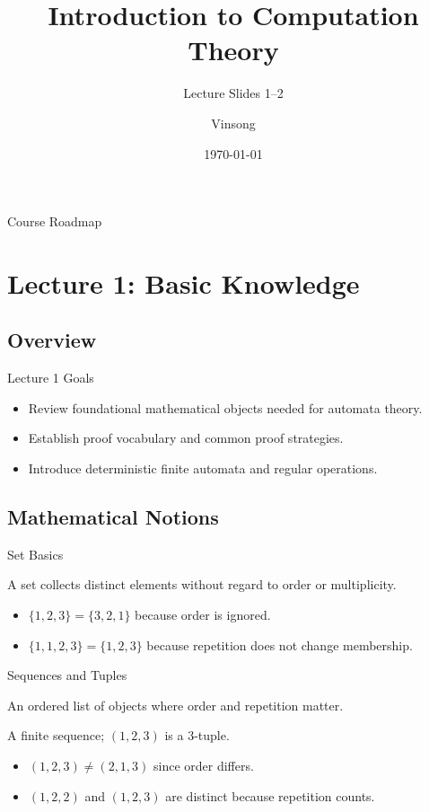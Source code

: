\documentclass[aspectratio=169]{beamer}
\title{Introduction to Computation Theory}
\subtitle{Lecture Slides 1--2}
\author{Vinsong}
\institute{NTU AMFL}
\date{\today}
\begin{document}
\begin{frame}
  \titlepage
\end{frame}

\begin{frame}{Course Roadmap}
  \tableofcontents
\end{frame}

\section{Lecture 1: Basic Knowledge}

\subsection{Overview}

\begin{frame}{Lecture 1 Goals}
  \begin{itemize}
    \item Review foundational mathematical objects needed for automata theory.
    \item Establish proof vocabulary and common proof strategies.
    \item Introduce deterministic finite automata and regular operations.
  \end{itemize}
\end{frame}

\subsection{Mathematical Notions}

\begin{frame}{Set Basics}
  \begin{definition}[Set]
    A set collects distinct elements without regard to order or multiplicity.
  \end{definition}
  \begin{itemize}
    \item $\{1,2,3\} = \{3,2,1\}$ because order is ignored.
    \item $\{1,1,2,3\} = \{1,2,3\}$ because repetition does not change membership.
  \end{itemize}
\end{frame}

\begin{frame}{Sequences and Tuples}
  \begin{definition}[Sequence]
    An ordered list of objects where order and repetition matter.
  \end{definition}
  \begin{definition}[Tuple]
    A finite sequence; $(1,2,3)$ is a $3$-tuple.
  \end{definition}
  \begin{itemize}
    \item $(1,2,3) \neq (2,1,3)$ since order differs.
    \item $(1,2,2)$ and $(1,2,3)$ are distinct because repetition counts.
  \end{itemize}
\end{frame}
\end{document}
